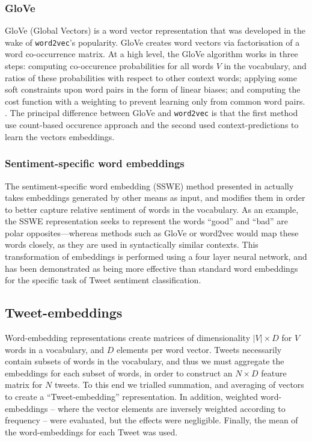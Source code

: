 \subsubsection{GloVe}
GloVe (Global Vectors) is a word vector representation that was developed in the wake of \texttt{word2vec}'s popularity. GloVe creates word vectors via factorisation of a word co-occurrence matrix. At a high level, the GloVe algorithm works in three steps: computing co-occurence probabilities for all words $V$ in the vocabulary, and ratios of these probabilities with respect to other context words; applying some soft constraints upon word pairs in the form of linear biases; and computing the cost function with a weighting to prevent learning only from common word pairs. \cite{pennington2014glove}. The principal difference between GloVe and \texttt{word2vec} is that the first method use count-based occurence approach and the second used context-predictions to learn the vectors embeddings. 

\subsubsection{Sentiment-specific word embeddings}
The sentiment-specific word embedding (SSWE) method presented in \cite{tang2014learning} actually takes embeddings generated by other means as input, and modifies them in order to better capture relative sentiment of words in the vocabulary. As an example, the SSWE representation seeks to represent the words ``good'' and ``bad'' are polar opposites---whereas methods such as GloVe or word2vec would map these words closely, as they are used in syntactically similar contexts. This transformation of embeddings is performed using a four layer neural network, and has been demonstrated as being more effective than standard word embeddings for the specific task of Tweet sentiment classification.

\subsection{Tweet-embeddings}
Word-embedding representations create matrices of dimensionality $|V| \times D$ for $V$ words in a vocabulary, and $D$ elements per word vector. Tweets necessarily contain subsets of words in the vocabulary, and thus we must aggregate the embeddings for each subset of words, in order to construct an $N \times D$ feature matrix for $N$ tweets. To this end we trialled summation, and averaging of vectors to create a ``Tweet-embedding'' representation. In addition, weighted word-embeddings -- where the vector elements are inversely weighted according to frequency -- were evaluated, but the effects were negligible. \cite{schnabel2015evaluation} Finally, the mean of the word-embeddings for each Tweet was used.

